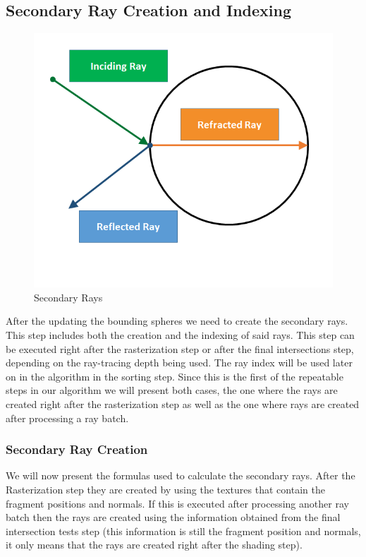 \subsection{Secondary Ray Creation and Indexing}

\begin{figure}[!htb]
    \centering
    \includegraphics[scale=0.65]{Images/Secondary_Rays}
    \caption{\label{fig:scr}Secondary Rays}
\end{figure}

After the updating the bounding spheres we need to create the secondary rays. This step includes both the creation and the indexing of said rays. This step can be executed right after the rasterization step or after the final intersections step, depending on the ray-tracing depth being used. The ray index will be used later on in the algorithm in the sorting step. Since this is the first of the repeatable steps in our algorithm we will present both cases, the one where the rays are created right after the rasterization step as well as the one where rays are created after processing a ray batch.

\subsubsection{Secondary Ray Creation}

We will now present the formulas used to calculate the secondary rays. After the Rasterization step they are created by using the textures that contain the fragment positions and normals. If this is executed after processing another ray batch then the rays are created using the information obtained from the final intersection tests step (this information is still the fragment position and normals, it only means that the rays are created right after the shading step). 

